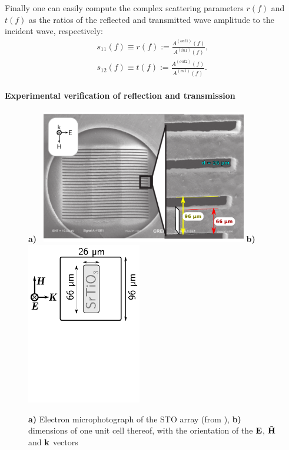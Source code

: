 Finally one can easily compute the complex scattering parameters $r(f)$ and $t(f)$ as the ratios of the reflected and transmitted wave amplitude to the incident wave, respectively:
\begin{equation} 
\begin{split}
s_{11}(f) \equiv r(f) := \frac{A^{(out 1)}(f)}{A^{(in 1)}(f)},\\
s_{12}(f) \equiv t(f) := \frac{A^{(out 2)}(f)}{A^{(in 1)}(f)}.
\end{split}
\label{eq_}\end{equation}

\paragraph{Experimental verification of reflection and transmission} 
\begin{figure} 
\caption{\textbf{a)} Electron microphotograph of the STO array (from \cite{nemec2009tunable}), %
\textbf{b)} dimensions of one unit cell thereof, with the orientation of the $\mathbf{E}$, $\mathbf{\tilde{H}}$ and ${\mathbf{k}}$ vectors}  \centering 
\textbf{a)} \mbox{\vspace{3cm} \includegraphics[width=9cm]{img/STOBar_photo.pdf}}  %
\mbox{\textbf{b)} \mbox{\vspace{3cm}\includegraphics[width=5cm]{img/EBars_STO_sketch.pdf}} }
\label{fg_STO_bar_geom} \end{figure} 
